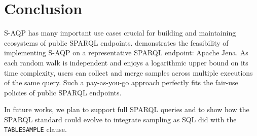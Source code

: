 
\section{Conclusion}

S-AQP has many important use cases crucial for building and
maintaining ecosystems of public SPARQL endpoints.
%
\NAME demonstrates the feasibility of implementing S-AQP on a
representative SPARQL endpoint: Apache Jena.  As each random walk is
independent and enjoys a logarithmic upper bound on its time
complexity, users can collect and merge samples across multiple
executions of the same query. Such a pay-as-you-go approach perfectly
fits the fair-use policies of public SPARQL endpoints.

\noindent In future works, we plan to support full SPARQL queries and
to show how the SPARQL standard could evolve to integrate sampling as
SQL did with the \verb|TABLESAMPLE| clause.
